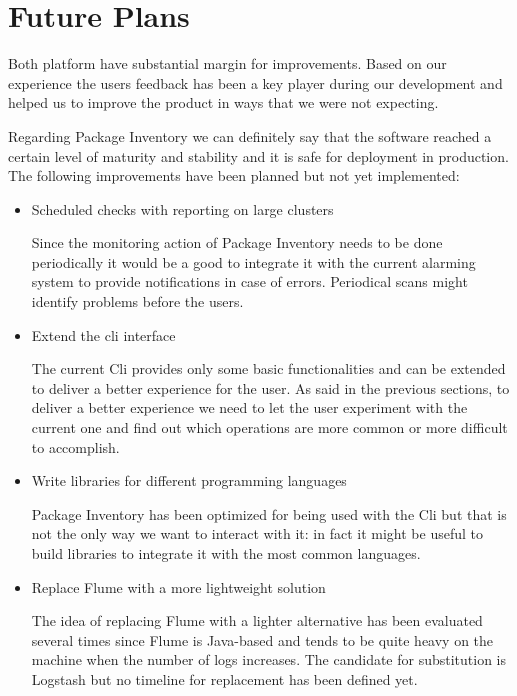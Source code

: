 \section{Future Plans}

Both platform have substantial margin for improvements. Based on our
experience the users feedback has been a key player during our development
and helped us to improve the product in ways that we were not expecting.

Regarding Package Inventory we can definitely say that the software
reached a certain level of maturity and stability and it is safe for
deployment in production. The following improvements have been planned but
not yet implemented:

\begin{itemize}

  \item Scheduled checks with reporting on large clusters

  Since the monitoring action of Package Inventory needs to be done
  periodically it would be a good to integrate it with the current
  alarming system to provide notifications in case of errors. Periodical
  scans might identify problems before the users.

  \item Extend the cli interface

  The current Cli provides only some basic functionalities and can be
  extended to deliver a better experience for the user. As said in the
  previous sections, to deliver a better experience we need to let the
  user experiment with the current one and find out which operations are
  more common or more difficult to accomplish.

  \item Write libraries for different programming languages

  Package Inventory has been optimized for being used with the Cli but
  that is not the only way we want to interact with it: in fact it might
  be useful to build libraries to integrate it with the most common
  languages.

  \item Replace Flume with a more lightweight solution

  The idea of replacing Flume with a lighter alternative has been
  evaluated several times since Flume is Java-based and tends to be quite
  heavy on the machine when the number of logs increases. The candidate
  for substitution is Logstash but no timeline for replacement has been
  defined yet.

\end{itemize}

